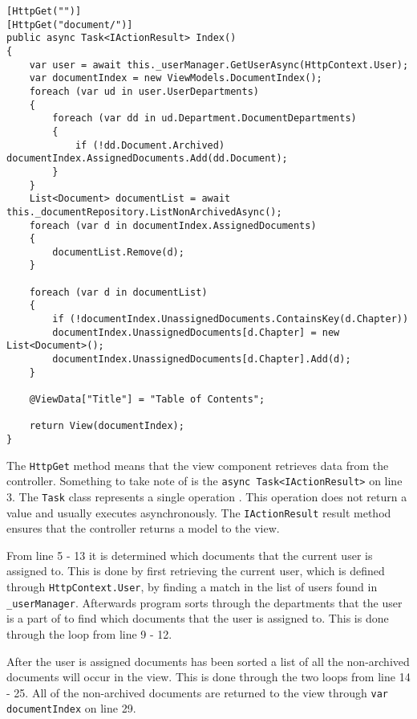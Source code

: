 \begin{lstlisting}[caption={Document Controller: Index}, label={lst:doccontroller}]
[HttpGet("")]
[HttpGet("document/")]
public async Task<IActionResult> Index()
{
	var user = await this._userManager.GetUserAsync(HttpContext.User);
	var documentIndex = new ViewModels.DocumentIndex();
	foreach (var ud in user.UserDepartments)
	{
		foreach (var dd in ud.Department.DocumentDepartments)
		{
			if (!dd.Document.Archived) documentIndex.AssignedDocuments.Add(dd.Document);
		}
	}
	List<Document> documentList = await this._documentRepository.ListNonArchivedAsync();
	foreach (var d in documentIndex.AssignedDocuments)
	{
		documentList.Remove(d);
	}

	foreach (var d in documentList)
	{
		if (!documentIndex.UnassignedDocuments.ContainsKey(d.Chapter))
		documentIndex.UnassignedDocuments[d.Chapter] = new List<Document>();
		documentIndex.UnassignedDocuments[d.Chapter].Add(d);
	}

	@ViewData["Title"] = "Table of Contents";

	return View(documentIndex);
}
\end{lstlisting}

The \texttt{HttpGet} method means that the view component retrieves data from the controller.
Something to take note of is the \texttt{async Task<IActionResult>} on line 3.
The \texttt{Task} class represents a single operation \cite{microsoft}.
This operation does not return a value and usually executes asynchronously.
The \texttt{IActionResult} result method ensures that the controller returns a model to the view.

From line 5 - 13 it is determined which documents that the current user is assigned to.
This is done by first retrieving the current user, which is defined through \texttt{HttpContext.User}, by finding a match in the list of users found in \texttt{_userManager}.
Afterwards program sorts through the departments that the user is a part of to find which documents that the user is assigned to.
This is done through the loop from line 9 - 12.

After the user is assigned documents has been sorted a list of all the non-archived documents will occur in the view.
This is done through the two loops from line 14 - 25.
All of the non-archived documents are returned to the view through \texttt{var documentIndex} on line 29.

